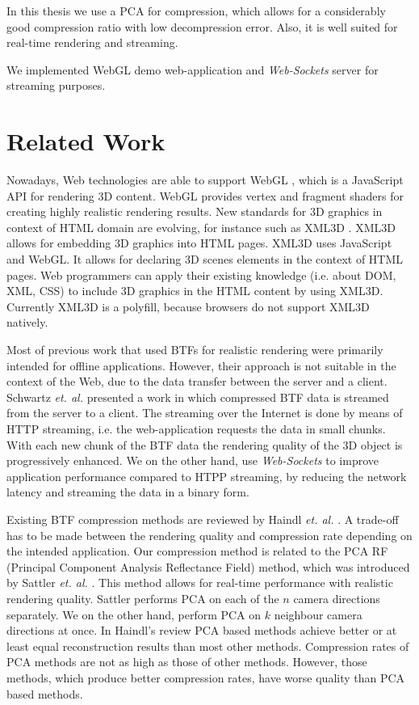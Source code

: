 In this thesis we use a PCA for compression, which allows for a considerably good compression ratio with low decompression error.
Also, it is well suited for real-time rendering and streaming.

We implemented WebGL demo web-application and \emph{Web-Sockets} server for streaming purposes.



\section{Related Work}
\label{section:related_work}

Nowadays, Web technologies are able to support WebGL \cite{webgl}, which is a JavaScript API for rendering 3D content.
WebGL provides  vertex and fragment shaders  for creating highly realistic rendering results.
New standards for 3D graphics in context of HTML domain are evolving, for instance such as XML3D \cite{xml3d}.
XML3D allows for embedding 3D graphics into HTML pages. XML3D uses JavaScript and WebGL.
It allows for declaring 3D scenes elements in the context of HTML pages.
Web programmers can apply their existing knowledge (i.e. about DOM, XML, CSS) to include 3D graphics in the HTML content by using XML3D.
Currently XML3D  is a polyfill, because browsers do not support XML3D natively.
 
Most of previous work that used BTFs for realistic rendering were primarily intended  for offline applications.
However, their approach is not suitable in the context of the Web, due to the data transfer between the server and a client.
  Schwartz \emph{et. al.} \cite{webglbtfstreaming} presented a work in which compressed BTF data is streamed from the server to a client.
 The streaming over the Internet is done by means of HTTP streaming, i.e. the web-application requests the data in small chunks.
 With each new chunk of the BTF data the rendering quality of the 3D object is progressively enhanced.
 We on the other hand, use \emph{Web-Sockets} to improve application performance compared to HTPP streaming, by reducing the network latency and streaming the data in a binary form.

 
Existing BTF compression methods are reviewed by Haindl \emph{et. al.} \cite{haindl, haindl_visual}.
A trade-off has to be made between the rendering quality and compression rate depending on the intended application.
 Our compression method is related to the PCA RF (Principal Component Analysis Reflectance Field) method, which was introduced by Sattler \emph{et. al.} \cite{star2004}.
This method allows for real-time performance with realistic rendering quality. 
Sattler performs PCA on each of the $n$ camera directions separately. We on the other hand, perform PCA on $k$ neighbour camera directions at once.
In Haindl's review \cite{haindl} PCA based methods achieve better or at least equal reconstruction results than most other methods.
Compression rates of PCA methods are not as high as those of other methods. However, those methods, which produce better compression rates, have worse quality than PCA based methods.



